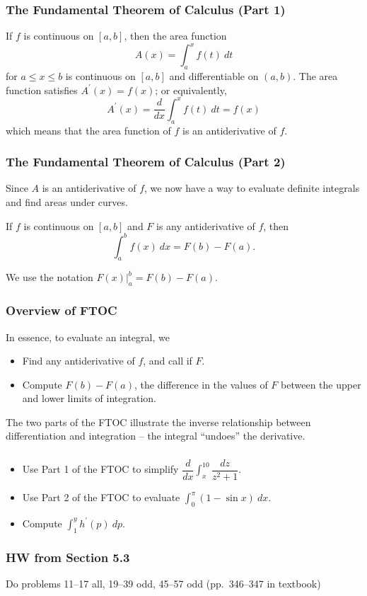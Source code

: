 \documentclass[14pt]{beamer}
\newcommand{\dint}{\displaystyle\int}
\begin{document}
\begin{frame}
\frametitle{\small The Fundamental Theorem of Calculus (Part 1)}
\footnotesize
\begin{thm}[FTOC I] If $f$ is continuous on $[a,b]$, then the area function 
\[A(x)=\dint_a^x f(t)\ dt\] 
for $a \le x \le b$ is continuous on $[a,b]$ and differentiable on $(a,b)$.  The area function satisfies $A^{\prime}(x)=f(x)$; or equivalently, 
\[A^{\prime}(x)=\frac{d}{dx} \dint_a^x f(t)\ dt = f(x)\]
which means that the area function of $f$ is an antiderivative of $f$.
\end{thm}
\end{frame}

\begin{frame}
\frametitle{\small The Fundamental Theorem of Calculus (Part 2)}
\small
Since $A$ is an antiderivative of $f$, we now have a way to evaluate definite integrals and find areas under curves.

\begin{thm}[FTOC II] If $f$ is continuous on $[a,b]$ and $F$ is any antiderivative of $f$, then
\[\int_a^b f(x)\ dx = F(b)-F(a).\]
\end{thm}

\vspace{1pc}
We use the notation $F(x) \vert_a^b = F(b)-F(a)$.
\end{frame}

\begin{frame}
\frametitle{\small Overview of FTOC}
\small
In essence, to evaluate an integral, we
\begin{itemize}
\item Find any antiderivative of $f$, and call if $F$.
\item Compute $F(b)-F(a)$, the difference in the values of $F$ between the upper and lower limits of integration.
\end{itemize}

The two parts of the FTOC illustrate the inverse relationship between differentiation and integration -- the integral ``undoes'' the derivative.
\end{frame}

\begin{frame}%
\frametitle{}
\small
\begin{exe}
\begin{itemize}
\item Use Part 1 of the FTOC to simplify $\dfrac{d}{dx} \dint_x^{10} \dfrac{dz}{z^2+1}$.

\vspace{0.75pc}
\item Use Part 2 of the FTOC to evaluate $\dint_0^{\pi} (1-\sin x)\ dx.$

\vspace{0.75pc}
\item Compute $\dint_1^y h^{\prime}(p)\ dp$.
\end{itemize}
\end{exe}
\end{frame}

\begin{frame}
\frametitle{HW from Section 5.3}  
Do problems 11--17 all, 19--39 odd, 45--57 odd (pp.\ 346--347 in textbook)
\end{frame}


\begin{comment}
\end{comment}
\end{document}
